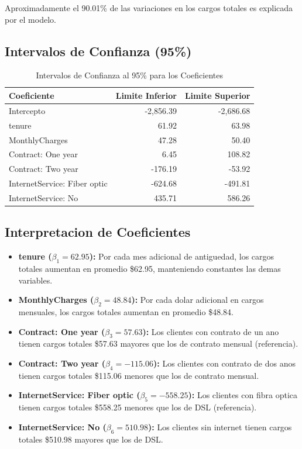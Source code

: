 \documentclass[12pt,a4paper]{article}
\begin{document}
Aproximadamente el 90.01\% de las variaciones en los cargos totales es explicada por el modelo.

\subsection{Intervalos de Confianza (95\%)}

\begin{table}[H]
\centering
\caption{Intervalos de Confianza al 95\% para los Coeficientes}
\begin{tabular}{lrr}
\toprule
\textbf{Coeficiente} & \textbf{Limite Inferior} & \textbf{Limite Superior} \\
\midrule
Intercepto & -2,856.39 & -2,686.68 \\
tenure & 61.92 & 63.98 \\
MonthlyCharges & 47.28 & 50.40 \\
Contract: One year & 6.45 & 108.82 \\
Contract: Two year & -176.19 & -53.92 \\
InternetService: Fiber optic & -624.68 & -491.81 \\
InternetService: No & 435.71 & 586.26 \\
\bottomrule
\end{tabular}
\end{table}

\subsection{Interpretacion de Coeficientes}

\begin{itemize}
    \item \textbf{tenure ($\beta_1 = 62.95$):} Por cada mes adicional de antiguedad, los cargos totales aumentan en promedio \$62.95, manteniendo constantes las demas variables.
    
    \item \textbf{MonthlyCharges ($\beta_2 = 48.84$):} Por cada dolar adicional en cargos mensuales, los cargos totales aumentan en promedio \$48.84.
    
    \item \textbf{Contract: One year ($\beta_3 = 57.63$):} Los clientes con contrato de un ano tienen cargos totales \$57.63 mayores que los de contrato mensual (referencia).
    
    \item \textbf{Contract: Two year ($\beta_4 = -115.06$):} Los clientes con contrato de dos anos tienen cargos totales \$115.06 menores que los de contrato mensual.
    
    \item \textbf{InternetService: Fiber optic ($\beta_5 = -558.25$):} Los clientes con fibra optica tienen cargos totales \$558.25 menores que los de DSL (referencia).
    
    \item \textbf{InternetService: No ($\beta_6 = 510.98$):} Los clientes sin internet tienen cargos totales \$510.98 mayores que los de DSL.
\end{itemize}
\end{document}
